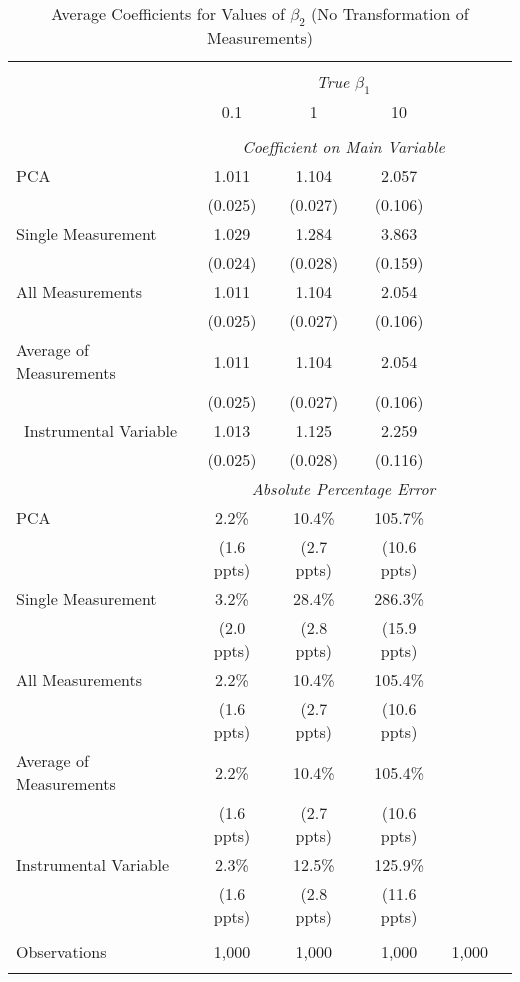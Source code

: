 \begin{table}[!htbp] \centering
  \caption{Average Coefficients for Values of $\beta_2$ (No Transformation of Measurements) \label{sim_beta2_5_noexp}}
\begin{tabular}{@{\extracolsep{5pt}}lccccc}
\\[-1.8ex]\hline
\hline \\[-1.8ex]
& \multicolumn{4}{c}{\textit{True $\beta_1$}} \
\cr \
\\[-1.8ex] & 0.1 & 1 & 10\\
\hline \\[-1.8ex]
& \multicolumn{4}{c}{\textit{Coefficient on Main Variable}} \\
 PCA & 1.011 & 1.104 & 2.057  \\
  & (0.025) & (0.027) & (0.106)\\
  Single Measurement & 1.029 & 1.284 & 3.863  \\
& (0.024) & (0.028) & (0.159)\\
 All Measurements & 1.011 & 1.104 & 2.054  \\
  & (0.025) & (0.027) & (0.106)\\
 Average of Measurements & 1.011 & 1.104 & 2.054  \\
  & (0.025) & (0.027) & (0.106)\\\
  Instrumental Variable & 1.013 & 1.125 & 2.259 \\
& (0.025) & (0.028) & (0.116) \\
& \multicolumn{4}{c}{\textit{Absolute Percentage Error}} \\
  PCA & 2.2\% & 10.4\% & 105.7\%  \\
   & (1.6 ppts) & (2.7 ppts) & (10.6 ppts)\\
   Single Measurement & 3.2\% & 28.4\% & 286.3\%  \\
& (2.0 ppts) & (2.8 ppts) & (15.9 ppts) \\
All Measurements & 2.2\% & 10.4\% & 105.4\%  \\
  & (1.6 ppts) & (2.7 ppts) & (10.6 ppts)\\
  Average of Measurements & 2.2\% & 10.4\% & 105.4\%  \\
  & (1.6 ppts) & (2.7 ppts) & (10.6 ppts)\\
  Instrumental Variable & 2.3\% & 12.5\% & 125.9\%  \\
& (1.6 ppts) & (2.8 ppts) & (11.6 ppts)\\

\hline \\[-1.8ex]
 Observations & 1,000 & 1,000 & 1,000 & 1,000 &\\
\hline
\hline \\[-1.8ex]
\end{tabular}
\end{table}